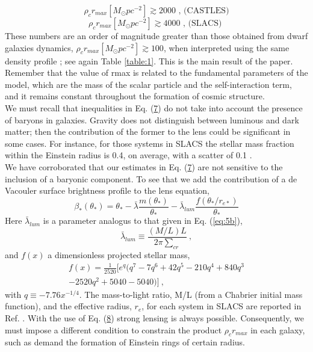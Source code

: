 \documentclass[8pt,letterpaper,twocolumn]{article}
\newcommand{\bl}{\bar{\lambda}}
\newcommand{\msun}{M_{\odot}} %
\begin{document}
\begin{equation} \tag{7a} \label{eq:7a}
\rho_c r_{max}[\msun p c^{-2}]\gtrsim 2000 \text{ , (CASTLES)}
\end{equation}
\begin{equation} \tag{7b} \label{eq:7b}
\rho_c r_{max}[\msun p c^{-2}]\gtrsim 4000 \text{ , (SLACS)\ \ \ \ \ }
\end{equation}
\vspace{0mm}
These numbers are an order of magnitude greater than those obtained from dwarf galaxies dynamics, $\rho_c r_{max}[\msun p c^{-2}]\gtrsim 100$, when interpreted using the same density profile \cite{Harko_2011}; see again Table \ref{table:1}. This is the main result of the paper. Remember that the value of rmax is related to the fundamental parameters of the model, which are the mass of the scalar particle and the self-interaction term, and it remains constant throughout the formation of cosmic structure.\\

We must recall that inequalities in Eq. (\hyperlink{eq:7}{7}) do not take into account the presence of baryons in galaxies. Gravity does not distinguish between luminous and dark matter; then the contribution of the former to the lens could be significant in some cases. For instance, for those systems in SLACS the stellar mass fraction within the Einstein radius is 0.4, on average, with a scatter of 0.1 \cite{Auger_2009}.\\

We have corroborated that our estimates in Eq. (\hyperlink{eq:7}{7}) are not sensitive to the inclusion of a baryonic component. To see that we add the contribution of a de Vacouler \hypertarget{eq:8}{surface} brightness profile \cite{1993ApJ...416..425M} to the lens equation,
\begin{equation} \tag{8a} \label{eq:8a}
\beta_*(\theta_*) = \theta_* - \bl\frac{m(\theta_*)}{\theta_*} - \bl_{lum}\frac{f(\theta_*/r_{e*})}{\theta_*}
\end{equation}
Here $\bl_{lum}$ is a parameter analogus to that given in Eq. (\ref{eq:5b}),
\begin{equation} \tag{8b} \label{eq:8b}
\bl_{lum} \equiv \frac{(M/L)L}{2 \pi {\scriptstyle \sum_{cr}}}\ ,
\end{equation}
and $f(x)$ a dimensionless projected stellar mass,
\begin{multline} \tag{8c}
f(x) = \frac{1}{2520}[e^q(q^7 -7q^6 + 42q^5 - 210q^4 + 840q^3\\
 -2520q^2 + 5040 - 5040)]\ ,
\end{multline}
with $q \equiv -7.76x^{-1/4}$. The mass-to-light ratio, M/L (from a Chabrier initial mass function), and the effective radius, $r_e$, for each system in SLACS are reported in Ref. \cite{Auger_2009}. With the use of Eq. (\hyperlink{eq:8}{8}) strong lensing is always possible. Consequently, we must impose a different condition to constrain the product $\rho_c r_{max}$ in each galaxy, such as demand the formation of Einstein rings of certain radius.\\
\end{document}
